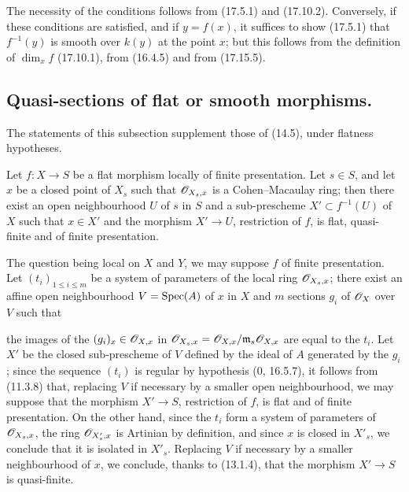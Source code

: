The necessity of the conditions follows from (17.5.1) and (17.10.2). Conversely, if these conditions are satisfied, and if $y=f(x)$, it suffices to show (17.5.1) that $f^{-1}(y)$ is smooth over $k(y)$ at the point $x$; but this follows from the definition of $\dim_x f$ (17.10.1), from (16.4.5) and from (17.15.5).

\subsection{Quasi-sections of flat or smooth morphisms.}

The statements of this subsection supplement those of (14.5), under flatness hypotheses.

\begin{proposition}[17.16.1]
\label{IV.17.16.1}
Let $f:X\to S$ be a flat morphism locally of finite presentation. Let $s\in S$, and let $x$ be a closed point of $X_s$ such that $\mathscr{O}_{X_s,x}$ is a Cohen--Macaulay ring; then there exist an open neighbourhood $U$ of $s$ in $S$ and a sub-prescheme $X'\subset f^{-1}(U)$ of $X$ such that $x\in X'$ and the morphism $X'\to U$, restriction of $f$, is flat, quasi-finite and of finite presentation.
\end{proposition}

The question being local on $X$ and $Y$, we may suppose $f$ of finite presentation. Let $(t_i)_{1\leq i\leq m}$ be a system of parameters of the local ring $\mathscr{O}_{X_s,x}$; there exist an affine open neighbourhood $V=\operatorname{Spec}(A)$ of $x$ in $X$ and $m$ sections $g_i$ of $\mathscr{O}_X$ over $V$ such that


the images of the $(g_i)_x\in\mathscr{O}_{X,x}$ in $\mathscr{O}_{X_s,x}=\mathscr{O}_{X,x}/\mathfrak m_s\mathscr{O}_{X,x}$ are equal to the $t_i$. Let $X'$ be the closed sub-prescheme of $V$ defined by the ideal of $A$ generated by the $g_i$; since the sequence $(t_i)$ is regular by hypothesis (0, 16.5.7), it follows from (11.3.8) that, replacing $V$ if necessary by a smaller open neighbourhood, we may suppose that the morphism $X'\to S$, restriction of $f$, is flat and of finite presentation. On the other hand, since the $t_i$ form a system of parameters of $\mathscr{O}_{X_s,x}$, the ring $\mathscr{O}_{X'_s,x}$ is Artinian by definition, and since $x$ is closed in $X'_s$, we conclude that it is isolated in $X'_s$. Replacing $V$ if necessary by a smaller neighbourhood of $x$, we conclude, thanks to (13.1.4), that the morphism $X'\to S$ is quasi-finite.

